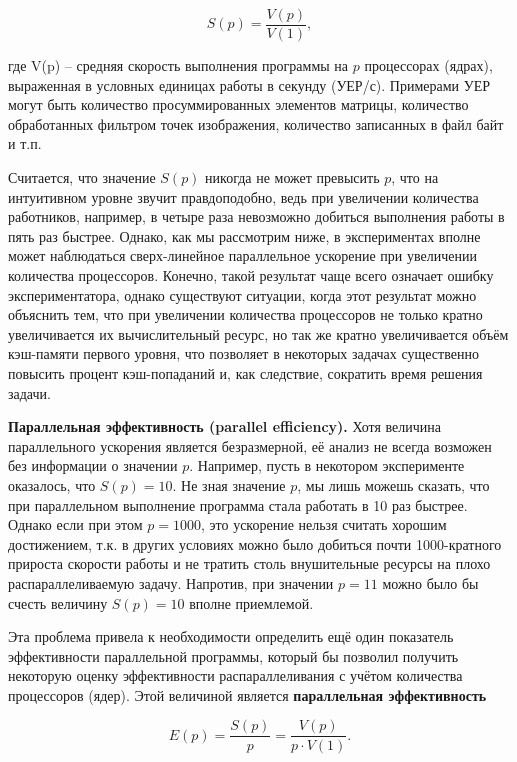 \begin{equation}
    \label{eq:parallel-acceleration}
    S(p) = \frac{V(p)}{V(1)},
\end{equation}

\noindent где V(p) – средняя скорость выполнения программы на $p$ процессорах (ядрах), выраженная в условных единицах работы в секунду (УЕР/с). Примерами УЕР могут быть количество просуммированных элементов матрицы, количество обработанных фильтром точек изображения, количество записанных в файл байт и т.п.

Считается, что значение $S(p)$ никогда не может превысить $p$, что на интуитивном уровне звучит правдоподобно, ведь при увеличении количества работников, например, в четыре раза невозможно добиться выполнения работы в пять раз быстрее.  Однако, как мы рассмотрим ниже, в экспериментах вполне может наблюдаться сверх-линейное параллельное ускорение при увеличении количества процессоров. Конечно, такой результат чаще всего означает ошибку экспериментатора, однако существуют ситуации, когда этот результат можно объяснить тем, что при увеличении количества процессоров не только кратно увеличивается их вычислительный ресурс, но так же кратно увеличивается объём кэш-памяти первого уровня, что позволяет в некоторых задачах существенно повысить процент кэш-попаданий и, как следствие, сократить время решения задачи.

\textbf{Параллельная эффективность (parallel efficiency).} Хотя величина параллельного ускорения является безразмерной, её анализ не всегда возможен без информации о значении $p$. Например, пусть в некотором эксперименте оказалось, что $S(p)=10$. Не зная значение $p$, мы лишь можешь сказать, что при параллельном выполнение программа стала работать в 10 раз быстрее. Однако если при этом $p=1000$, это ускорение нельзя считать хорошим достижением, т.к. в других условиях можно было добиться почти 1000-кратного прироста скорости работы и не тратить столь внушительные ресурсы на плохо распараллеливаемую задачу. Напротив, при значении $p=11$ можно было бы счесть  величину $S(p)=10$ вполне приемлемой.

Эта проблема привела к необходимости определить ещё один показатель эффективности параллельной программы, который бы позволил получить некоторую оценку эффективности распараллеливания с учётом количества процессоров (ядер). Этой величиной является \textbf{параллельная эффективность}

\begin{equation}
    \label{eq:parallel-efficiency}
    E(p) = \frac{S(p)}{p} = \frac{V(p)}{p \cdot V(1)}.
\end{equation}

